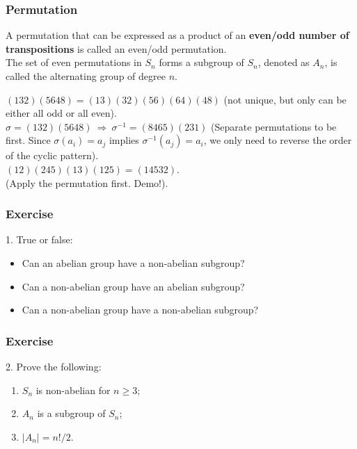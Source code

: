 \documentclass{beamer}
\begin{document}
\begin{frame}
    \frametitle{Permutation}
    \hh A permutation that can be expressed as a product of an \textbf{even/odd number 
    of transpositions} is called an even/odd permutation. \\
    \hh The set of even permutations in $S_n$ forms 
    a subgroup of $S_n$, denoted as $A_n$, 
    is called the alternating group of degree $n$. \\\vv

     $(132)(5648)=(13)(32)(56)(64)(48)$ (not unique, but only can be either all odd or all even).
	\\\vs{0.3em}
	 $\sigma=(132)(5648) \ \Rightarrow \ \sigma^{-1}=(8465)(231)$ 
    (Separate permutations to be \textbf{} first. Since $\sigma(a_i) = a_j$ implies $\sigma^{-1}(a_j) = a_i$, we only need to reverse the order of the cyclic pattern).
	\\\vs{0.3em}
	 $(12)(245)(13)(125) = (14532).$ \\
    (Apply the \textbf{} permutation first. Demo!).
\end{frame}
\begin{frame}
    \frametitle{Exercise}
    1. True or false:
    \begin{itemize}
        \item Can an abelian group have a non-abelian subgroup?
        \item Can a non-abelian group have an abelian subgroup?
        \item Can a non-abelian group have a non-abelian subgroup?
    \end{itemize}
    \vs{3em}
\end{frame}
\begin{frame}
    \frametitle{Exercise}
        2. Prove the following:
        \begin{enumerate}
            \item $S_n$ is non-abelian for $n\geq 3$;~\\
            \item $A_n$ is a subgroup of $S_n$;~\\
            \item $|A_n|=n!/2.$~\\
        \end{enumerate}
\end{frame}
\end{document}
